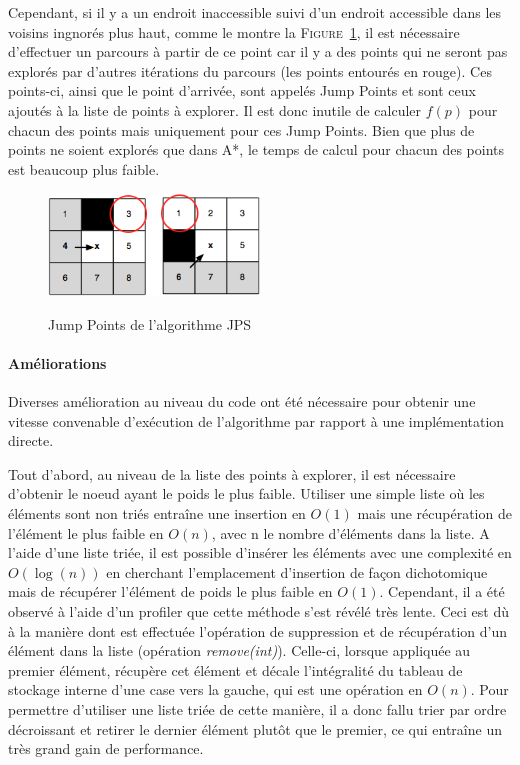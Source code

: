 Cependant, si il y a un endroit inaccessible suivi d'un endroit accessible dans les voisins ingnorés plus haut, comme le montre la \textsc{Figure}~\ref{fig:jmp_point_jps}, il est nécessaire d'effectuer un parcours à partir de ce point car il y a des points qui ne seront pas explorés par d'autres itérations du parcours (les points entourés en rouge).
Ces points-ci, ainsi que le point d'arrivée, sont appelés Jump Points et sont ceux ajoutés à la liste de points à explorer.
Il est donc inutile de calculer $f(p)$ pour chacun des points mais uniquement pour ces Jump Points.
Bien que plus de points ne soient explorés que dans A*, le temps de calcul pour chacun des points est beaucoup plus faible.

\begin{figure}[h!]
	\centering
	\includegraphics[width=0.5\textwidth]{jmp_point_jps.png}
	\\[0.2cm]
	\caption{Jump Points de l'algorithme JPS}
	\label{fig:jmp_point_jps}
\end{figure}

\paragraph{Améliorations\\}

Diverses amélioration au niveau du code ont été nécessaire pour obtenir une vitesse convenable d'exécution de l'algorithme par rapport à une implémentation directe.

Tout d'abord, au niveau de la liste des points à explorer, il est nécessaire d'obtenir le noeud ayant le poids le plus faible.
Utiliser une simple liste où les éléments sont non triés entraîne une insertion en $O(1)$ mais une récupération de l'élément le plus faible en $O(n)$, avec n le nombre d'éléments dans la liste.
A l'aide d'une liste triée, il est possible d'insérer les éléments avec une complexité en $O(\log(n))$ en cherchant l'emplacement d'insertion de façon dichotomique mais de récupérer l'élément de poids le plus faible en $O(1)$.
Cependant, il a été observé à l'aide d'un profiler que cette méthode s'est révélé très lente.
Ceci est dù à la manière dont est effectuée l'opération de suppression et de récupération d'un élément dans la liste (opération \textit{remove(int)}).
Celle-ci, lorsque appliquée au premier élément, récupère cet élément et décale l'intégralité du tableau de stockage interne d'une case vers la gauche, qui est une opération en $O(n)$.
Pour permettre d'utiliser une liste triée de cette manière, il a donc fallu trier par ordre décroissant et retirer le dernier élément plutôt que le premier, ce qui entraîne un très grand gain de performance.

